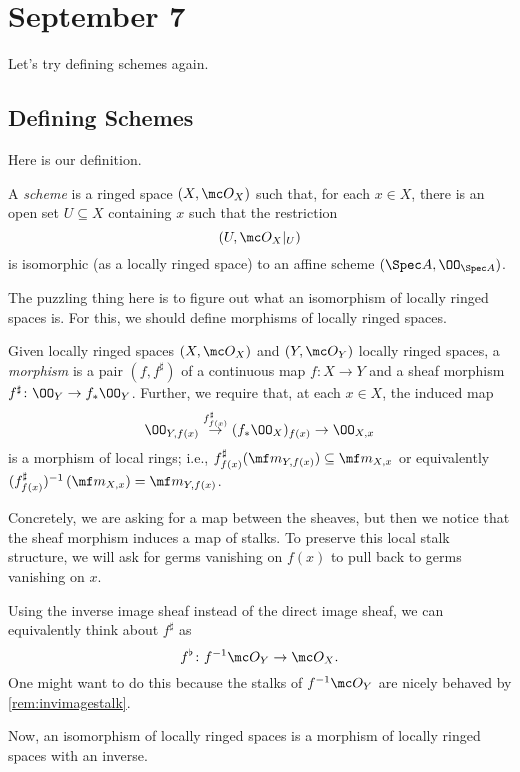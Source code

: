 \documentclass[../notes.tex]{subfiles}
\begin{document}
\section{September 7}
Let's try defining schemes again.

\subsection{Defining Schemes}
Here is our definition.
\begin{definition}[Scheme]
	A \textit{scheme} is a ringed space $(X,\mc O_X)$ such that, for each $x\in X$, there is an open set $U\subseteq X$ containing $x$ such that the restriction
	\[(U,\mc O_X|_U)\]
	is isomorphic (as a locally ringed space) to an affine scheme $(\Spec A,\OO_{\Spec A})$.
\end{definition}
The puzzling thing here is to figure out what an isomorphism of locally ringed spaces is. For this, we should define morphisms of locally ringed spaces.
\begin{definition}
	Given locally ringed spaces $(X,\mc O_X)$ and $(Y,\mc O_Y)$ locally ringed spaces, a \textit{morphism} is a pair $(f,f^\sharp)$ of a continuous map $f\colon X\to Y$ and a sheaf morphism $f^\sharp\colon\OO_Y\to f_*\OO_Y$. Further, we require that, at each $x\in X$, the induced map
	\[\OO_{Y,f(x)}\stackrel{f^\sharp_{f(x)}}\to(f_*\OO_X)_{f(x)}\to\OO_{X,x}\]
	is a morphism of local rings; i.e., $f^\sharp_{f(x)}(\mf m_{Y,f(x)})\subseteq\mf m_{X,x}$ or equivalently $(f^\sharp_{f(x)})^{-1}\left(\mf m_{X,x}\right)=\mf m_{Y,f(x)}$.
\end{definition}
Concretely, we are asking for a map between the sheaves, but then we notice that the sheaf morphism induces a map of stalks. To preserve this local stalk structure, we will ask for germs vanishing on $f(x)$ to pull back to germs vanishing on $x$.
\begin{remark}
	Using the inverse image sheaf instead of the direct image sheaf, we can equivalently think about $f^\sharp$ as
	\[f^\flat\colon f^{-1}\mc O_Y\to\mc O_X.\]
	One might want to do this because the stalks of $f^{-1}\mc O_Y$ are nicely behaved by \autoref{rem:invimagestalk}.
\end{remark}
Now, an isomorphism of locally ringed spaces is a morphism of locally ringed spaces with an inverse.
\end{document}
